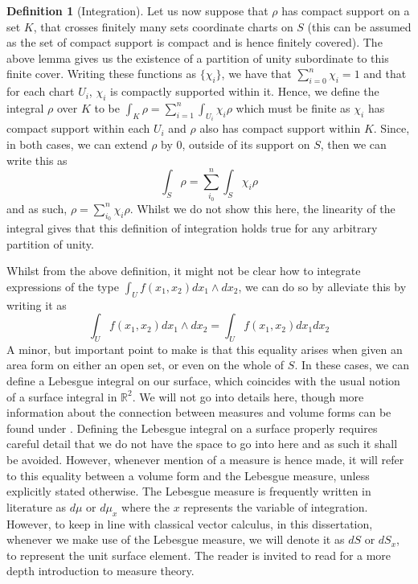 \documentclass[11pt]{report}
\theoremstyle{definition}
\newtheorem{defn}[thm]{Definition}
\begin{document}
\begin{defn}[Integration]
  Let us now suppose that $\rho$ has compact support on a set $K$, that crosses finitely many sets coordinate charts on $S$ (this can be assumed as the set of compact support is compact and is hence finitely covered). The above lemma gives us the existence of a partition of unity subordinate to this finite cover. Writing these functions as $\{\chi_i\}$, we have that $\sum\limits_{i = 0}^n \chi_i = 1$ and that for each chart $U_i$, $\chi_i$ is compactly supported within it. Hence, we define the integral $\rho$ over $K$ to be $\int_K \rho = \sum\limits_{i=1}^n\int_{U_i}\chi_i\rho$ which must be finite as $\chi_i$ has compact support within each $U_i$ and $\rho$ also has compact support within $K$. Since, in both cases, we can extend $\rho$ by 0, outside of its support on $S$, then we can write this as 
  \[\int_S \rho = \sum\limits_{i_0}^n\int_S\chi_i\rho\]
  and as such, $\rho = \sum\limits_{i_0}^n\chi_i\rho$. Whilst we do not show this here, the linearity of the integral gives that this definition of integration holds true for any arbitrary partition of unity.
\end{defn}

Whilst from the above definition, it might not be clear how to integrate expressions of the type $\int_U f(x_1,x_2)dx_1\wedge dx_2$, we can do so by alleviate this by writing it as 
\[\int_U f(x_1,x_2)dx_1\wedge dx_2 = \int_U f(x_1,x_2)dx_1dx_2\]
A minor, but important point to make is that this equality arises when given an area form on either an open set, or even on the whole of $S$. In these cases, we can define a Lebesgue integral on our surface, which coincides with the usual notion of a surface integral in $\mathbb{R}^2$. We will not go into details here, though more information about the connection between measures and volume forms can be found under \cite[(Volume measure)]{volformiste}. Defining the Lebesgue integral on a surface properly requires careful detail that we do not have the space to go into here and as such it shall be avoided. However, whenever mention of a measure is hence made, it will refer to this equality between a volume form and the Lebesgue measure, unless explicitly stated otherwise. The Lebesgue measure is frequently written in literature as $d\mu$ or $d\mu_x$ where the $x$ represents the variable of integration. However, to keep in line with classical vector calculus, in this dissertation, whenever we make use of the Lebesgue measure, we will denote it as $dS$ or $dS_x$, to represent the unit surface element. The reader is invited to read \cite[Chapter 11]{babyRudin} for a more depth introduction to measure theory.
\end{document}
